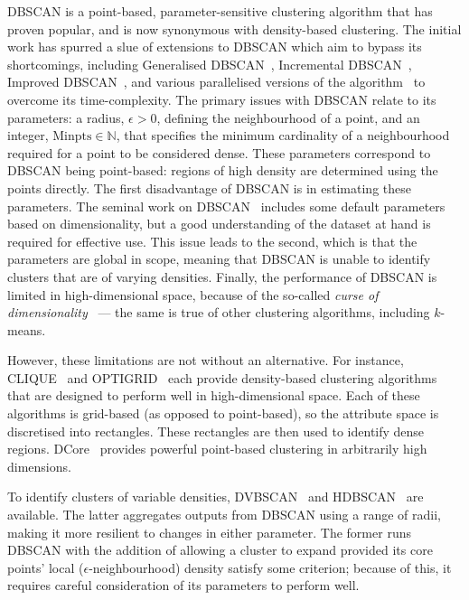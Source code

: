 DBSCAN is a point-based, parameter-sensitive clustering algorithm that has
proven popular, and is now synonymous with density-based clustering. The initial
work has spurred a slue of extensions to DBSCAN which aim to bypass its
shortcomings, including Generalised DBSCAN~\cite{Sander1998}, Incremental
DBSCAN~\cite{Bakr2015,Ester1998}, Improved DBSCAN~\cite{Borah2004}, and various
parallelised versions of the algorithm~\cite{Bohm2009,He2011,Loh2014,Xu2002} to
overcome its time-complexity. The primary issues with DBSCAN relate to its
parameters: a radius, \(\epsilon > 0\), defining the neighbourhood of a point,
and an integer, \(\text{Minpts} \in \mathbb N\), that specifies the minimum
cardinality of a neighbourhood required for a point to be considered dense.
These parameters correspond to DBSCAN being point-based: regions of high density
are determined using the points directly. The first disadvantage of DBSCAN is in
estimating these parameters. The seminal work on DBSCAN~\cite{Ester1996}
includes some default parameters based on dimensionality, but a good
understanding of the dataset at hand is required for effective use. This issue
leads to the second, which is that the parameters are global in scope, meaning
that DBSCAN is unable to identify clusters that are of varying densities.
Finally, the performance of DBSCAN is limited in high-dimensional space, because
of the so-called \emph{curse of dimensionality}~\cite{Keogh2017} --- the same is
true of other clustering algorithms, including \(k\)-means.

However, these limitations are not without an alternative. For instance,
CLIQUE~\cite{Agrawal1998} and OPTIGRID~\cite{Hinneburg1999} each provide
density-based clustering algorithms that are designed to perform well in
high-dimensional space. Each of these algorithms is grid-based (as opposed to
point-based), so the attribute space is discretised into rectangles. These
rectangles are then used to identify dense regions. DCore~\cite{Chen2018}
provides powerful point-based clustering in arbitrarily high dimensions.

To identify clusters of variable densities, DVBSCAN~\cite{Ram2010} and
HDBSCAN~\cite{Campello2013} are available. The latter aggregates outputs from
DBSCAN using a range of radii, making it more resilient to changes in either
parameter. The former runs DBSCAN with the addition of allowing a cluster to
expand provided its core points' local (\(\epsilon\)-neighbourhood) density
satisfy some criterion; because of this, it requires careful consideration of
its parameters to perform well.

